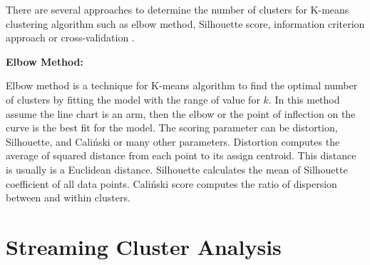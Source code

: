 \documentclass[../UNBThesis2.tex]{subfiles}
\begin{document}















There are several approaches to determine the number of clusters for K-means clustering algorithm such as elbow method, Silhouette score, information criterion approach or cross-validation \cite{kodinariya2013review}.



\noindent\textbf{Elbow Method:}

Elbow method is a technique for K-means algorithm to find the optimal number of clusters by fitting the model with the range of value for $k$. In this method assume the line chart is an arm, then the elbow or the point of inflection on the curve is the best fit for the model. The scoring parameter can be distortion, Silhouette, and Caliński or many other parameters. Distortion computes the average of squared distance from each point to its assign centroid. This distance is usually is a Euclidean distance. Silhouette calculates the mean of Silhouette coefficient of all data points. Caliński score computes the ratio of dispersion between and within clusters.







\section{Streaming Cluster Analysis }
\end{document}
